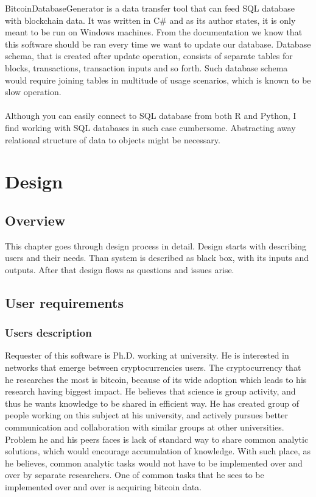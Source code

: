 \documentclass[12pt, en, eng, oneside]{mgr}
\begin{document}
BitcoinDatabaseGenerator is a data transfer tool that can feed SQL database with blockchain data. It was written in C\# and as its author states, it is only meant to be run on Windows machines. From the documentation we know that this software should be ran every time we want to update our database. Database schema, that is created after update operation, consists of separate tables for blocks, transactions, transaction inputs and so forth. Such database schema would require joining tables in multitude of usage scenarios, which is known to be slow operation.
\\
\\
Although you can easily connect to SQL database from both R and Python, I find working with SQL databases in such case cumbersome. Abstracting away relational structure of data to objects might be necessary. 


\chapter{Design}

\section{Overview}
This chapter goes through design process in detail. Design starts with describing users and their needs. Than system is described as black box, with its inputs and outputs. After that design flows as questions and issues arise. 

\section{User requirements}

\subsection{Users description}

Requester of this software is Ph.D. working at university. He is interested in networks that emerge between cryptocurrencies users. The cryptocurrency that he researches the most is bitcoin, because of its wide adoption which leads to his research having biggest impact. He believes that science is group activity, and thus he wants knowledge to be shared in efficient way. He has created group of people working on this subject at his university, and actively pursues better communication and collaboration with similar groups at other universities. Problem he and his peers faces is lack of standard way to share common analytic solutions, which would encourage accumulation of knowledge. With such place, as he believes, common analytic tasks would not have to be implemented over and over by separate researchers. One of common tasks that he sees to be implemented over and over is acquiring bitcoin data.  
\end{document}

